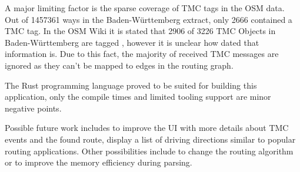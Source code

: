 \documentclass[a4paper]{scrartcl}
\begin{document}
A major limiting factor is the sparse coverage of TMC tags in the OSM data. Out of 1457361 ways in the Baden-Württemberg extract, only 2666 contained a TMC tag. In the OSM Wiki it is stated that 2906 of 3226 TMC Objects in Baden-Württemberg are tagged \cite{osm_wiki_tmc}, however it is unclear how dated that information is. Due to this fact, the majority of received TMC messages are ignored as they can't be mapped to edges in the routing graph. 

The Rust programming language proved to be suited for building this application, only the compile times and limited tooling support are minor negative points.

Possible future work includes to improve the UI with more details about TMC events and the found route, display a list of driving directions similar to popular routing applications. Other possibilities include to change the routing algorithm or to improve the memory efficiency during parsing. 

\printbibliography
\end{document}
